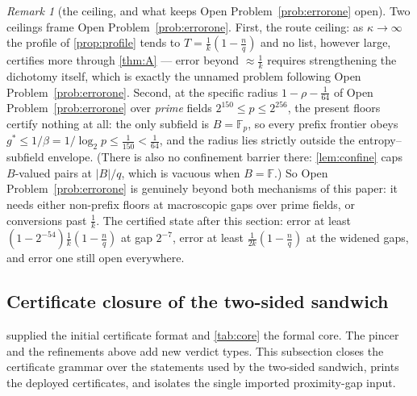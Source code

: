 \documentclass[11pt]{article}
\theoremstyle{definition}
\theoremstyle{remark}
\newtheorem{remark}[theorem]{Remark}
\newcommand{\F}{\mathbb{F}}
\newcommand{\B}{B}
\begin{document}
\begin{remark}[the ceiling, and what keeps Open Problem~\ref{prob:errorone} open]\label{rem:profile-ceiling}
Two ceilings frame Open Problem~\ref{prob:errorone}. First, the route ceiling: as $\kappa\to\infty$ the profile of \cref{prop:profile} tends to $T=\frac1k(1-\frac nq)$ and no list, however large, certifies more through \cref{thm:A} --- error beyond $\approx\frac1k$ requires strengthening the dichotomy itself, which is exactly the unnamed problem following Open Problem~\ref{prob:errorone}. Second, at the specific radius $1-\rho-\frac1{64}$ of Open Problem~\ref{prob:errorone} over \emph{prime} fields $2^{150}\le p\le2^{256}$, the present floors certify nothing at all: the only subfield is $\B=\F_p$, so every prefix frontier obeys $g^*\le1/\beta=1/\log_2p\le\frac1{150}<\frac1{64}$, and the radius lies strictly outside the entropy--subfield envelope. \textup(There is also no confinement barrier there: \cref{lem:confine} caps $\B$-valued pairs at $|\B|/q$, which is vacuous when $\B=\F$.\textup) So Open Problem~\ref{prob:errorone} is genuinely beyond both mechanisms of this paper: it needs either non-prefix floors at macroscopic gaps over prime fields, or conversions past $\frac1k$. The certified state after this section: error at least $(1-2^{-54})\frac1k(1-\frac nq)$ at gap $2^{-7}$, error at least $\frac1{2k}(1-\frac nq)$ at the widened gaps, and error one still open everywhere.
\end{remark}

\subsection{Certificate closure of the two-sided sandwich}\label{sec:answers-T7}

 supplied the initial certificate format and \cref{tab:core} the formal core.  The pincer and the refinements above add new verdict types.  This subsection closes the certificate grammar over the statements used by the two-sided sandwich, prints the deployed certificates, and isolates the single imported proximity-gap input.
\end{document}
